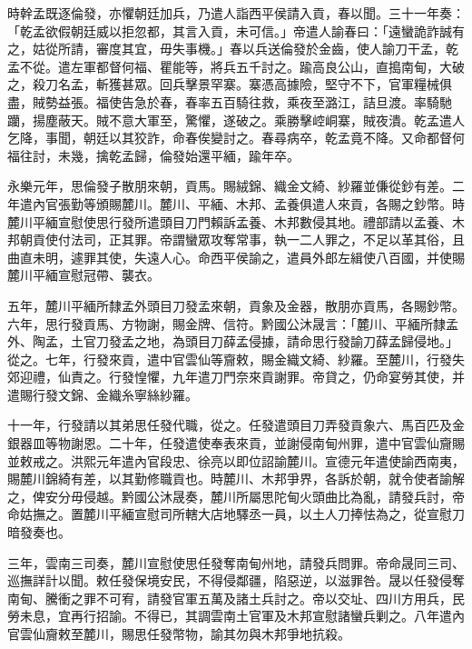 \begin{pinyinscope}
時幹孟既逐倫發，亦懼朝廷加兵，乃遣人詣西平侯請入貢，春以聞。三十一年奏：「乾孟欲假朝廷威以拒忽都，其言入貢，未可信。」帝遣人諭春曰：「遠蠻詭詐誠有之，姑從所請，審度其宜，毋失事機。」春以兵送倫發於金齒，使人諭刀干孟，乾孟不從。遣左軍都督何福、瞿能等，將兵五千討之。踰高良公山，直搗南甸，大破之，殺刀名孟，斬獲甚眾。回兵擊景罕寨。寨憑高據險，堅守不下，官軍糧械俱盡，賊勢益張。福使告急於春，春率五百騎往救，乘夜至潞江，詰旦渡。率騎馳躪，揚塵蔽天。賊不意大軍至，驚懼，遂破之。乘勝擊崆峒寨，賊夜潰。乾孟遣人乞降，事聞，朝廷以其狡詐，命春俟變討之。春尋病卒，乾孟竟不降。又命都督何福往討，未幾，擒乾孟歸，倫發始還平緬，踰年卒。

永樂元年，思倫發子散朋來朝，貢馬。賜絨錦、織金文綺、紗羅並傔從鈔有差。二年遣內官張勤等頒賜麓川。麓川、平緬、木邦、孟養俱遣人來貢，各賜之鈔幣。時麓川平緬宣慰使思行發所遣頭目刀門賴訴孟養、木邦數侵其地。禮部請以孟養、木邦朝貢使付法司，正其罪。帝謂蠻眾攻奪常事，執一二人罪之，不足以革其俗，且曲直未明，遽罪其使，失遠人心。命西平侯諭之，遣員外郎左緝使八百國，并使賜麓川平緬宣慰冠帶、襲衣。

五年，麓川平緬所隸孟外頭目刀發孟來朝，貢象及金器，散朋亦貢馬，各賜鈔幣。六年，思行發貢馬、方物謝，賜金牌、信符。黔國公沐晟言：「麓川、平緬所隸孟外、陶孟，土官刀發孟之地，為頭目刀薛孟侵據，請命思行發諭刀薛孟歸侵地。」從之。七年，行發來貢，遣中官雲仙等齎敕，賜金織文綺、紗羅。至麓川，行發失郊迎禮，仙責之。行發惶懼，九年遣刀門奈來貢謝罪。帝貸之，仍命宴勞其使，并遣賜行發文錦、金織糸寧絲紗羅。

十一年，行發請以其弟思任發代職，從之。任發遣頭目刀弄發貢象六、馬百匹及金銀器皿等物謝恩。二十年，任發遣使奉表來貢，並謝侵南甸州罪，遣中官雲仙齎賜並敕戒之。洪熙元年遣內官段忠、徐亮以即位詔諭麓川。宣德元年遣使諭西南夷，賜麓川錦綺有差，以其勤修職貢也。時麓川、木邦爭界，各訴於朝，就令使者諭解之，俾安分毋侵越。黔國公沐晟奏，麓川所屬思陀甸火頭曲比為亂，請發兵討，帝命姑撫之。置麓川平緬宣慰司所轄大店地驛丞一員，以土人刀捧怯為之，從宣慰刀暗發奏也。

三年，雲南三司奏，麓川宣慰使思任發奪南甸州地，請發兵問罪。帝命晟同三司、巡撫詳計以聞。敕任發保境安民，不得侵鄰疆，陷惡逆，以滋罪咎。晟以任發侵奪南甸、騰衝之罪不可宥，請發官軍五萬及諸土兵討之。帝以交址、四川方用兵，民勞未息，宜再行招諭。不得已，其調雲南土官軍及木邦宣慰諸蠻兵剿之。八年遣內官雲仙齎敕至麓川，賜思任發幣物，諭其勿與木邦爭地抗殺。


\end{pinyinscope}

